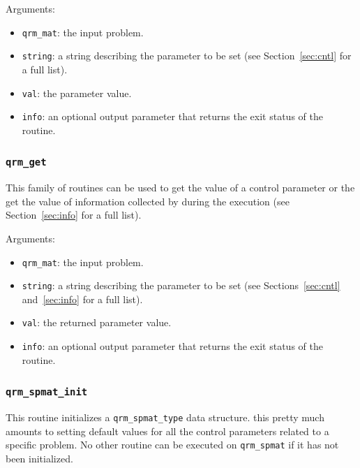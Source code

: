 \documentclass[11pt]{article}
\begin{document}

\noindent Arguments:
\begin{itemize}
\item \texttt{qrm\_mat}: the input problem.
\item \texttt{string}: a string describing the parameter to be set
  (see Section~\ref{sec:cntl} for a full list).
\item \texttt{val}: the parameter value.
\item \texttt{info}: an optional output parameter that returns the
  exit status of the routine.
\end{itemize}

\subsubsection{\texttt{qrm\_get}}
\label{sec:get}
This family of routines can be used to get the value of a control
parameter or the get the value of information collected by \qrm during
the execution (see Section~\ref{sec:info} for a full list). 

\noindent Arguments:
\begin{itemize}
\item \texttt{qrm\_mat}: the input problem.
\item \texttt{string}: a string describing the parameter to be set
  (see Sections~\ref{sec:cntl} and~\ref{sec:info} for a full list).
\item \texttt{val}: the returned parameter value.
\item \texttt{info}: an optional output parameter that returns the
  exit status of the routine.
\end{itemize}



\subsubsection{\texttt{qrm\_spmat\_init}}
This routine initializes a \texttt{qrm\_spmat\_type} data structure. this
pretty much amounts to setting default values for all the control
parameters related to a specific problem. No other routine can be
executed on \texttt{qrm\_spmat} if it has not been initialized.

\end{document}
